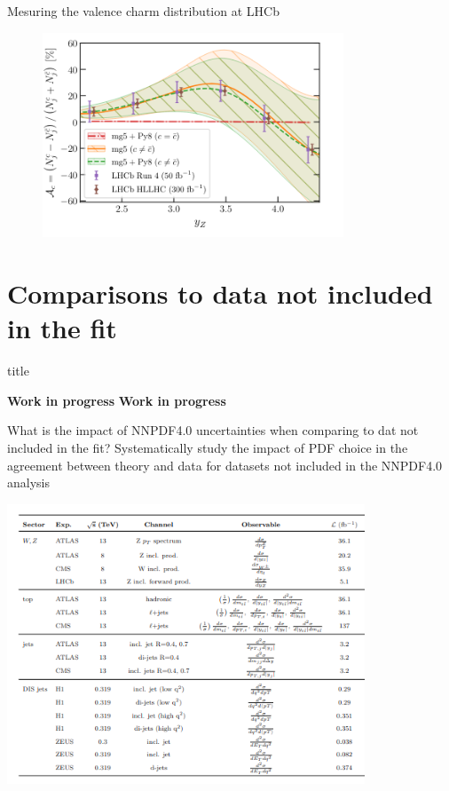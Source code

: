 \documentclass[aspectratio=43, 8pt,t]{beamer}
\newcommand{\SectionTitleFrame}[1][]{%
  \begin{frame}
    \vfill
    \centering
    \begin{beamercolorbox}[sep=8pt,center,shadow=true,rounded=true]{title}
      \usebeamerfont{title}\insertsection\par
    \end{beamercolorbox}
    \ifx\relax#1\relax\else
      \vspace{0.5cm}
      \textbf{#1}
    \fi
    \vfill
  \end{frame}
}
\begin{document}
\begin{frame}{Mesuring the valence charm distribution at LHCb}
  \begin{figure}
    \includegraphics[width=0.8\textwidth]{valence_charm_lhcb.png}
  \end{figure}
\end{frame}



\section*{Comparisons to data not included in the fit}
\SectionTitleFrame[\textbf{Work in progress}]

\begin{frame}{What is the impact of NNPDF4.0 uncertainties when comparing to dat not included in the fit?}
  Systematically study the impact of PDF choice in the agreement between theory and data for datasets not included in the NNPDF4.0 analysis

  \includegraphics[width=0.8\textwidth]{pheno_paper_datastes.png}

\end{frame}
\end{document}
